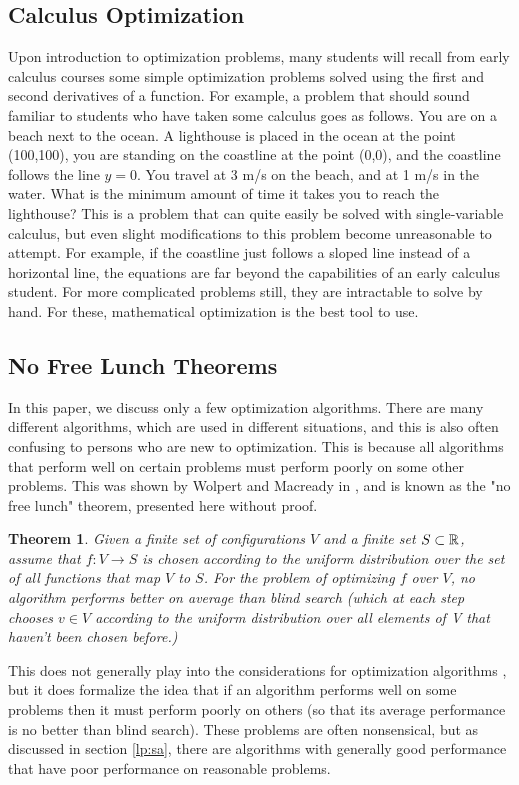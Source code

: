 \documentclass[10pt]{article}
\newcommand{\R}[1][]{ \ifx&#1& \mathbb{R} \else \mathbb{R}^{#1} \fi }
\newtheorem{theorem}{Theorem}[section]
\newenvironment{exampleblock}[1]{\tcolorbox[beamer,noparskip,breakable,title={#1}]}{\endtcolorbox}
\begin{document}
\subsection{Calculus Optimization}
Upon introduction to optimization problems, many students will recall from early calculus courses some simple optimization problems solved using the first and second derivatives of a function. For example, a problem that should sound familiar to students who have taken some calculus goes as follows. 
\begin{exampleblock}{Calculus Optimization Example}
	You are on a beach next to the ocean. A lighthouse is placed in the ocean at the point (100,100), you are standing on the coastline at the point (0,0), and the coastline follows the line $y=0$. You travel at 3 m/s on the beach, and at 1 m/s in the water. What is the minimum amount of time it takes you to reach the lighthouse?
\end{exampleblock}
This is a problem that can quite easily be solved with single-variable calculus, but even slight modifications to this problem become unreasonable to attempt. For example, if the coastline just follows a sloped line instead of a horizontal line, the equations are far beyond the capabilities of an early calculus student. For more complicated problems still, they are intractable to solve by hand. For these, mathematical optimization is the best tool to use.
\subsection{No Free Lunch Theorems}
In this paper, we discuss only a few optimization algorithms. There are many different algorithms, which are used in different situations, and this is also often confusing to persons who are new to optimization. This is because all algorithms that perform well on certain problems must perform poorly on some other problems. This was shown by Wolpert and Macready in \cite{wm-nfl}, and is known as the "no free lunch" theorem, presented here without proof.
\begin{theorem}
	Given a finite set of configurations $V$ and a finite set $S\subset\R$, assume that $f:V\to S$ is chosen according to the uniform distribution over the set of all functions that map $V$ to $S$. For the problem of optimizing $f$ over $V$, no algorithm performs better on average than blind search (which at each step chooses $v\in V$ according to the uniform distribution over all elements of V that haven't been chosen before.)
\end{theorem}
This does not generally play into the considerations for optimization algorithms \cite{wdw-comp-the-nfl}, but it does formalize the idea that if an algorithm performs well on some problems then it must perform poorly on others (so that its average performance is no better than blind search). These problems are often nonsensical, but as discussed in section \ref{lp:sa}, there are algorithms with generally good performance that have poor performance on reasonable problems.
\end{document}
